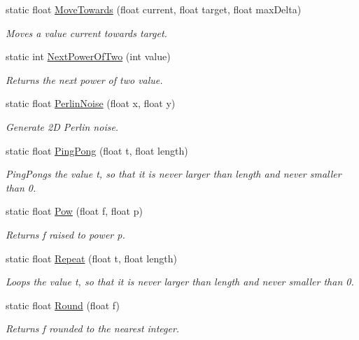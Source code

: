 \begin{DoxyCompactItemize}
static float \mbox{\hyperlink{class_lua_1_1_mathf_a0b9df3fa414f0b12c2fcfd1eee83570c}{Move\+Towards}} (float current, float target, float max\+Delta)
\begin{DoxyCompactList}\small\item\em Moves a value current towards target. \end{DoxyCompactList}\item 
static int \mbox{\hyperlink{class_lua_1_1_mathf_abc78356d294242d7d4f10dc5e3e81a81}{Next\+Power\+Of\+Two}} (int value)
\begin{DoxyCompactList}\small\item\em Returns the next power of two value. \end{DoxyCompactList}\item 
static float \mbox{\hyperlink{class_lua_1_1_mathf_a3044ff5b1dd835169520fd054c713d63}{Perlin\+Noise}} (float x, float y)
\begin{DoxyCompactList}\small\item\em Generate 2D Perlin noise. \end{DoxyCompactList}\item 
static float \mbox{\hyperlink{class_lua_1_1_mathf_a8eed89df943f9dc0df1398e541e023ad}{Ping\+Pong}} (float t, float length)
\begin{DoxyCompactList}\small\item\em Ping\+Pongs the value t, so that it is never larger than length and never smaller than 0. \end{DoxyCompactList}\item 
static float \mbox{\hyperlink{class_lua_1_1_mathf_ace6b91fa037354fa541a5de450ba6e23}{Pow}} (float f, float p)
\begin{DoxyCompactList}\small\item\em Returns f raised to power p. \end{DoxyCompactList}\item 
static float \mbox{\hyperlink{class_lua_1_1_mathf_abf1f882dcf08b3749a27a28f6f7f3630}{Repeat}} (float t, float length)
\begin{DoxyCompactList}\small\item\em Loops the value t, so that it is never larger than length and never smaller than 0. \end{DoxyCompactList}\item 
static float \mbox{\hyperlink{class_lua_1_1_mathf_a9f6511ccc1da8fd5228959f67b995d91}{Round}} (float f)
\begin{DoxyCompactList}\small\item\em Returns f rounded to the nearest integer. \end{DoxyCompactList}\item 

\end{DoxyCompactItemize}
